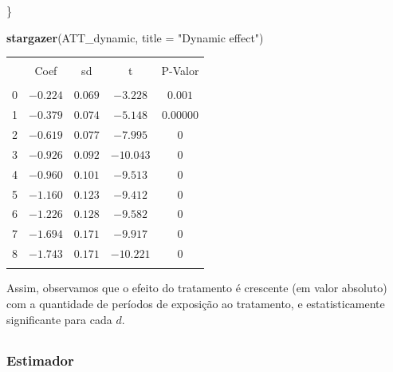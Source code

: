 \documentclass[portugues]{article}
\newenvironment{Shaded}{\begin{snugshade}}{\end{snugshade}}
\newcommand{\AttributeTok}[1]{\textcolor[rgb]{0.13,0.29,0.53}{#1}}
\newcommand{\FunctionTok}[1]{\textcolor[rgb]{0.13,0.29,0.53}{\textbf{#1}}}
\newcommand{\NormalTok}[1]{#1}
\newcommand{\StringTok}[1]{\textcolor[rgb]{0.31,0.60,0.02}{#1}}
\begin{document}
\begin{box_code}
\begin{Shaded}
\begin{Highlighting}[]
\NormalTok{\}}

\FunctionTok{stargazer}\NormalTok{(ATT\_dynamic, }\AttributeTok{title =} \StringTok{"Dynamic effect"}\NormalTok{)}
\end{Highlighting}
\end{Shaded}

\begingroup
    \fontsize{8pt}{12pt}\selectfont
    \begin{center}
    \caption{Efeito médio por quantidade de anos tratado}

    \caption{ATT(d) - Dynamic effect}
    
    \begin{tabular}{lcccc} 
    \hline \\[-1.8ex] 
     & Coef & sd & t & P-Valor \\ 
    \hline \\[-1.8ex] 
    0 & $-0.224$ & $0.069$ & $-3.228$ & $0.001$ \\ 
    1 & $-0.379$ & $0.074$ & $-5.148$ & $0.00000$ \\ 
    2 & $-0.619$ & $0.077$ & $-7.995$ & $0$ \\ 
    3 & $-0.926$ & $0.092$ & $-10.043$ & $0$ \\ 
    4 & $-0.960$ & $0.101$ & $-9.513$ & $0$ \\ 
    5 & $-1.160$ & $0.123$ & $-9.412$ & $0$ \\ 
    6 & $-1.226$ & $0.128$ & $-9.582$ & $0$ \\ 
    7 & $-1.694$ & $0.171$ & $-9.917$ & $0$ \\ 
    8 & $-1.743$ & $0.171$ & $-10.221$ & $0$ \\         
    \hline \\[-1.8ex] 
    \end{tabular} 
    \end{center}
 \endgroup

\end{box_code}

Assim, observamos que o efeito do tratamento é crescente (em valor absoluto) com a quantidade de períodos de exposição ao tratamento, e estatisticamente significante para cada $d$. 

\subsection{\cite{callaway2021difference}} \label{sec:Cal_e_Sant}

\subsubsection{Estimador}
\end{document}
